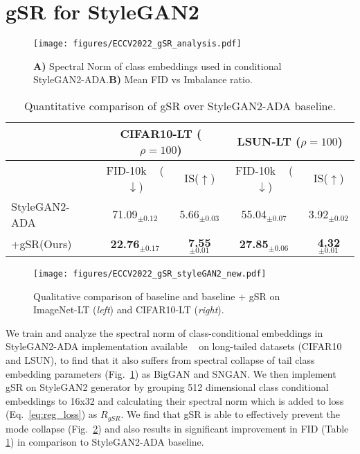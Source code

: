 \documentclass[runningheads,table]{llncs}
\begin{document}
\section{gSR for StyleGAN2}
\label{sec:supp:sg2}
\begin{figure}[t]
    \centering
  \texttt{[image: figures/ECCV2022\_gSR\_analysis.pdf]}
    \caption{\small\textbf{A)} Spectral Norm of class embeddings used in conditional StyleGAN2-ADA.\textbf{B)} Mean FID vs Imbalance ratio.}
    \label{fig:supp:ablation}
\end{figure}
 \begin{table}[t]
    \centering
    \caption{Quantitative comparison of  gSR over StyleGAN2-ADA baseline.}
    \label{tab:quant_sg2}
    \begin{tabular}{lcccc} \hline
     & \multicolumn{2}{c}{CIFAR10-LT ($\rho = 100$)} & \multicolumn{2}{c}{LSUN-LT ($\rho = 100$)} \\ \hline
    & FID-10k ~\cite{zhao2020differentiable}  ($\downarrow$)&      IS($\uparrow$)& FID-10k ~\cite{zhao2020differentiable} ($\downarrow$)&      IS($\uparrow$)  \\\hline
  StyleGAN2-ADA & 71.09$_{\pm0.12}$ & 5.66$_{\pm0.03}$ & 55.04$_{\pm0.07}$ & 3.92$_{\pm0.02}$ \\
  +gSR(Ours) & \textbf{22.76}$_{\pm0.17}$ & \textbf{7.55}$_{\pm0.01}$ & \textbf{27.85}$_{\pm0.06}$ & \textbf{4.32}$_{\pm0.01}$ \\ \hline
  \end{tabular}
  \label{tab:stylegan2}
\end{table}
\begin{figure}[h]
    \centering
  \texttt{[image: figures/ECCV2022\_gSR\_styleGAN2\_new.pdf]}
    \caption{\small Qualitative comparison of baseline and baseline + gSR on ImageNet-LT (\emph{left}) and CIFAR10-LT (\emph{right}).}
    \label{fig:supp:qual_results}
\end{figure}
 We train and analyze the spectral norm of class-conditional embeddings in StyleGAN2-ADA implementation available ~\cite{kang2020contrastive} on long-tailed datasets (CIFAR10 and LSUN), to find that it also suffers from spectral collapse of tail class embedding parameters (Fig.\ \ref{fig:supp:ablation}) as BigGAN and SNGAN. We then implement gSR on StyleGAN2 generator by grouping 512 dimensional class conditional embeddings to 16x32 and calculating their spectral norm  which is added to loss (Eq.\ \ref{eq:reg_loss}) as $R_{gSR}$. We find that gSR is able to effectively prevent the mode collapse (Fig.~\ref{fig:supp:qual_results}) and also results in significant improvement in FID (Table \ref{tab:stylegan2}) in comparison to StyleGAN2-ADA baseline.







\clearpage
 

\end{document}
